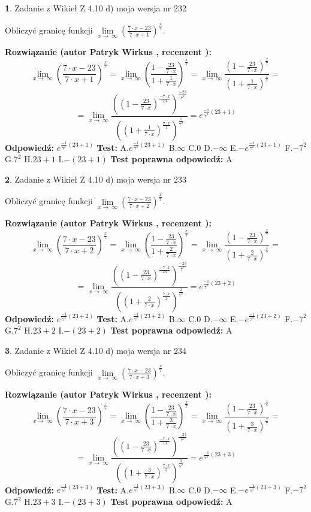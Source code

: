 \documentclass[12pt, a4paper]{article}
\theoremstyle{definition} %
\newtheorem{zad}{}
\newcommand{\zadStart}[1]{\begin{zad}#1\newline}
\newcommand{\zadStop}{\end{zad}}
\newcommand{\rozwStart}[2]{\noindent \textbf{Rozwiązanie (autor #1 , recenzent #2): }\newline}
\newcommand{\rozwStop}{\newline}
\newcommand{\odpStart}{\noindent \textbf{Odpowiedź:}\newline}
\newcommand{\odpStop}{\newline}
\newcommand{\testStart}{\noindent \textbf{Test:}\newline}
\newcommand{\testStop}{\newline}
\newcommand{\kluczStart}{\noindent \textbf{Test poprawna odpowiedź:}\newline}
\newcommand{\kluczStop}{\newline}
\begin{document}
\zadStart{Zadanie z Wikieł Z 4.10 d) moja wersja nr 232}


Obliczyć granicę funkcji  $\lim\limits_{x\to\ \infty}(\frac{7\cdot x-23}{7\cdot x+1})^{\frac{x}{7}}$.
\zadStop
\rozwStart{Patryk Wirkus}{}
$$\lim\limits_{x\to\ \infty}(\frac{7\cdot x-23}{7\cdot x+1})^{\frac{x}{7}} = \lim\limits_{x\to\ \infty}(\frac{1-\frac{23}{7\cdot x}}{1+\frac{1}{7\cdot x}})^{\frac{x}{7}}=\lim\limits_{x\to\ \infty}\frac{(1-\frac{23}{7\cdot x})^{\frac{x}{7}}}{(1+\frac{1}{7\cdot x})^{\frac{x}{7}}}=$$
$$=\lim\limits_{x\to\ \infty}\frac{((1-\frac{23}{7\cdot x})^{\frac{-7\cdot x}{23}})^{\frac{-23}{7^{2}}}}{((1+\frac{1}{7\cdot x})^{\frac{7\cdot x}{1}})^{\frac{1}{7^{2}}}}=e^{\frac{-1}{7^{2}}(23+1)}$$
\rozwStop
\odpStart
$e^{\frac{-1}{7^{2}}(23+1)}$
\odpStop
\testStart
A.$e^{\frac{-1}{7^{2}}(23+1)}$ B.$\infty$ C.$0$ D.$-\infty$ E.$-e^{\frac{-1}{7^{2}}(23+1)}$
F.$-7^{2}$ G.$7^{2}$
H.$23+1$
I.$-(23+1)$
\testStop
\kluczStart
A
\kluczStop



\zadStart{Zadanie z Wikieł Z 4.10 d) moja wersja nr 233}


Obliczyć granicę funkcji  $\lim\limits_{x\to\ \infty}(\frac{7\cdot x-23}{7\cdot x+2})^{\frac{x}{7}}$.
\zadStop
\rozwStart{Patryk Wirkus}{}
$$\lim\limits_{x\to\ \infty}(\frac{7\cdot x-23}{7\cdot x+2})^{\frac{x}{7}} = \lim\limits_{x\to\ \infty}(\frac{1-\frac{23}{7\cdot x}}{1+\frac{2}{7\cdot x}})^{\frac{x}{7}}=\lim\limits_{x\to\ \infty}\frac{(1-\frac{23}{7\cdot x})^{\frac{x}{7}}}{(1+\frac{2}{7\cdot x})^{\frac{x}{7}}}=$$
$$=\lim\limits_{x\to\ \infty}\frac{((1-\frac{23}{7\cdot x})^{\frac{-7\cdot x}{23}})^{\frac{-23}{7^{2}}}}{((1+\frac{2}{7\cdot x})^{\frac{7\cdot x}{2}})^{\frac{2}{7^{2}}}}=e^{\frac{-1}{7^{2}}(23+2)}$$
\rozwStop
\odpStart
$e^{\frac{-1}{7^{2}}(23+2)}$
\odpStop
\testStart
A.$e^{\frac{-1}{7^{2}}(23+2)}$ B.$\infty$ C.$0$ D.$-\infty$ E.$-e^{\frac{-1}{7^{2}}(23+2)}$
F.$-7^{2}$ G.$7^{2}$
H.$23+2$
I.$-(23+2)$
\testStop
\kluczStart
A
\kluczStop



\zadStart{Zadanie z Wikieł Z 4.10 d) moja wersja nr 234}


Obliczyć granicę funkcji  $\lim\limits_{x\to\ \infty}(\frac{7\cdot x-23}{7\cdot x+3})^{\frac{x}{7}}$.
\zadStop
\rozwStart{Patryk Wirkus}{}
$$\lim\limits_{x\to\ \infty}(\frac{7\cdot x-23}{7\cdot x+3})^{\frac{x}{7}} = \lim\limits_{x\to\ \infty}(\frac{1-\frac{23}{7\cdot x}}{1+\frac{3}{7\cdot x}})^{\frac{x}{7}}=\lim\limits_{x\to\ \infty}\frac{(1-\frac{23}{7\cdot x})^{\frac{x}{7}}}{(1+\frac{3}{7\cdot x})^{\frac{x}{7}}}=$$
$$=\lim\limits_{x\to\ \infty}\frac{((1-\frac{23}{7\cdot x})^{\frac{-7\cdot x}{23}})^{\frac{-23}{7^{2}}}}{((1+\frac{3}{7\cdot x})^{\frac{7\cdot x}{3}})^{\frac{3}{7^{2}}}}=e^{\frac{-1}{7^{2}}(23+3)}$$
\rozwStop
\odpStart
$e^{\frac{-1}{7^{2}}(23+3)}$
\odpStop
\testStart
A.$e^{\frac{-1}{7^{2}}(23+3)}$ B.$\infty$ C.$0$ D.$-\infty$ E.$-e^{\frac{-1}{7^{2}}(23+3)}$
F.$-7^{2}$ G.$7^{2}$
H.$23+3$
I.$-(23+3)$
\testStop
\kluczStart
A
\kluczStop
\end{document}
